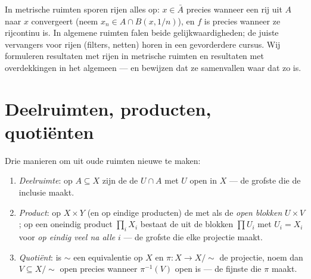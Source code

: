 \begin{remark}\label{rem:b3:topology:sequences}
In metrische ruimten sporen rijen alles op: $x \in \bar A$ precies
wanneer een rij uit $A$ naar $x$ convergeert (neem $x_n \in A \cap
B(x, 1/n)$), en $f$ is  precies wanneer ze rijcontinu is.
In algemene ruimten falen beide gelijkwaardigheden; de juiste
vervangers voor rijen (filters, netten) horen in een gevorderdere
cursus. Wij formuleren resultaten met rijen in metrische ruimten
en resultaten met overdekkingen in het algemeen --- en bewijzen
dat ze samenvallen waar dat zo is.
\end{remark}

\section{Deelruimten, producten, quotiënten}

\begin{definition}\label{def:b3:topology:constructions}
Drie manieren om uit oude ruimten nieuwe te maken:
\begin{enumerate}
  \item \emph{Deelruimte}: op $A \subseteq X$ zijn de  de $U \cap A$ met $U$ open in $X$ --- de
        grofste  die de inclusie  maakt.
  \item \emph{Product}: op $X \times Y$ (en op eindige producten)
        de  met als  de \emph{open blokken} $U
        \times V$; op een oneindig product $\prod_i X_i$ bestaat
        de  uit de blokken $\prod U_i$ met $U_i = X_i$ voor
        \emph{op eindig veel na alle} $i$ --- de grofste 
        die elke projectie  maakt.
  \item \emph{Quotiënt}: is $\sim$ een equivalentie op $X$ en
        $\pi\colon X \to X/{\sim}$ de projectie, noem dan $V
        \subseteq X/{\sim}$ open precies wanneer $\pi^{-1}(V)$
        open is --- de fijnste  die $\pi$  maakt.
\end{enumerate}
\end{definition}

